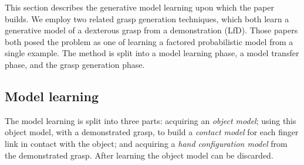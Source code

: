 This section describes the generative model learning upon which the paper builds. We employ two related grasp generation techniques\cite{kopicki2015ijrr, kopicki2019ijrr}, which both learn a generative model of a dexterous grasp from a demonstration (LfD). Those papers both posed the problem as one of learning a factored probabilistic model from a single example. The method is split into a model learning phase, a model transfer phase, and the grasp generation phase. 

\subsection{Model learning}
The model learning is split into three parts: acquiring an {\em object model}; using this object model, with a demonstrated grasp, to build a {\em contact model} for each finger link in contact with the object; and acquiring a {\em hand configuration model} from the demonstrated grasp. After learning the object model can be discarded.

